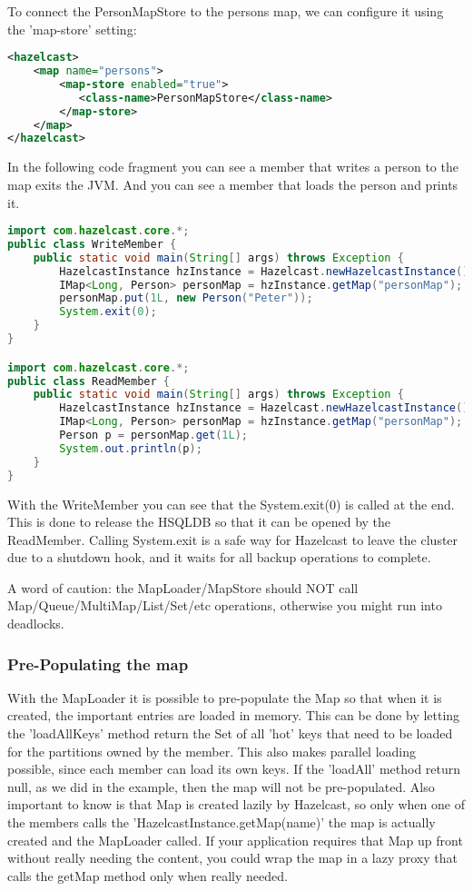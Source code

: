 To connect the PersonMapStore to the persons map, we can configure it using the 'map-store' setting:
\begin{lstlisting}[language=xml]
<hazelcast>
    <map name="persons">
        <map-store enabled="true">
           <class-name>PersonMapStore</class-name>
        </map-store>
    </map>
</hazelcast>
\end{lstlisting}
In the following code fragment you can see a member that writes a person to the map exits the JVM. And you can see a member that loads the person and prints it. 
\begin{lstlisting}[language=java]
import com.hazelcast.core.*;
public class WriteMember {
    public static void main(String[] args) throws Exception {
        HazelcastInstance hzInstance = Hazelcast.newHazelcastInstance();
        IMap<Long, Person> personMap = hzInstance.getMap("personMap");
        personMap.put(1L, new Person("Peter"));
        System.exit(0);
    }
}

import com.hazelcast.core.*;
public class ReadMember {
    public static void main(String[] args) throws Exception {
        HazelcastInstance hzInstance = Hazelcast.newHazelcastInstance();
        IMap<Long, Person> personMap = hzInstance.getMap("personMap");
        Person p = personMap.get(1L);
        System.out.println(p);
    }
}
\end{lstlisting}
With the WriteMember you can see that the System.exit(0) is called at the end. This is done to release the HSQLDB so that it can be opened by the ReadMember. Calling System.exit is a safe way for Hazelcast to leave the cluster  due to a shutdown hook, and it waits for all backup operations to complete.

A word of caution: the MapLoader/MapStore should NOT call Map/Queue/MultiMap/List/Set/etc operations, otherwise you might run into deadlocks. 

\subsubsection{Pre-Populating the map}
With the MapLoader it is possible to pre-populate the Map so that when it is created, the important entries are loaded in memory. This can be done by letting the 'loadAllKeys' method return the Set of all 'hot' keys that need to be loaded for the partitions owned by the member. This also makes parallel loading possible, since each member can load its own keys.  If the 'loadAll' method return null, as we did in the example, then the map will not be pre-populated. Also important to know is that Map is created lazily by Hazelcast, so only when one of the members calls the 'HazelcastInstance.getMap(name)' the map is actually created and the MapLoader called. If your application requires that Map up front without really needing the content, you could wrap the map in a lazy proxy that calls the getMap method only when really needed.

